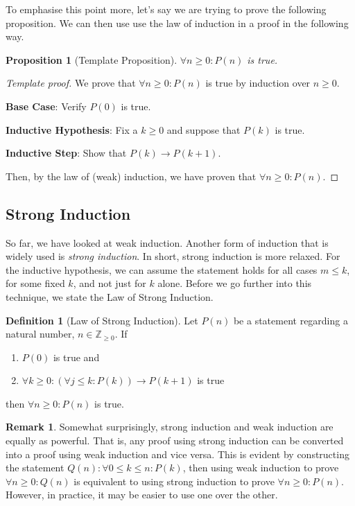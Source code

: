 \documentclass{article}
\newcommand{\ra}{\rightarrow}
\newcommand{\ZZ}{\mathbb{Z}_{\geq 0}}
\theoremstyle{plain}
\newtheorem*{proposition*}{Proposition}
\theoremstyle{definition}
\newtheorem{definition}{Definition}
\newtheorem{remark}{Remark}
\begin{document}
To emphasise this point more, let's say we are trying to prove the following proposition. We can then use use the law of induction in a proof in the following way.

\begin{proposition*}[Template Proposition]
    \(\forall n \geq 0 : P(n)\) is true.
\end{proposition*}
\begin{proof}[Template proof]
    We prove that \(\forall n \geq 0 : P(n)\) is true by induction over \(n \geq 0\).
    
    \textbf{Base Case}: Verify \(P(0)\) is true.

    \textbf{Inductive Hypothesis}: Fix a \(k \geq 0\) and suppose that \(P(k)\) is true.

    \textbf{Inductive Step}: Show that \(P(k) \ra P(k+1)\).

    Then, by the law of (weak) induction, we have proven that \(\forall n \geq 0 : P(n)\).
\end{proof}
 
\subsection{Strong Induction}

So far, we have looked at weak induction. Another form of induction that is widely used is \emph{strong induction}. In short, strong induction is more relaxed. For the inductive hypothesis, we can assume the statement holds for all cases \(m \leq k\), for some fixed \(k\), and not just for \(k\) alone. Before we go further into this technique, we state the Law of Strong Induction.

\begin{definition}[Law of Strong Induction]
    Let \(P(n)\) be a statement regarding a natural number, \(n \in \ZZ\). If
    \begin{enumerate}
        \item \(P(0)\) is true and
        \item \(\forall k \geq 0 : (\forall j \leq k :  P(k)) \ra P(k+1)\) is true
    \end{enumerate}    
    then \(\forall n \geq 0 : P(n)\) is true.
\end{definition}

\begin{remark}
Somewhat surprisingly, strong induction and weak induction are equally as powerful. That is, any proof using strong induction can be converted into a proof using weak induction and vice versa. This is evident by constructing the statement \(Q(n): \forall 0 \leq k \leq n : P(k)\), then using weak induction to prove \(\forall n \geq 0 : Q(n)\) is equivalent to using strong induction to prove \(\forall n \geq 0 : P(n)\). However, in practice, it may be easier to use one over the other.
\end{remark}
\end{document}
